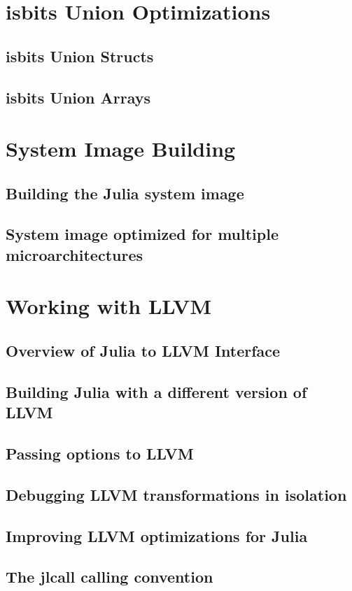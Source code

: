     \section{isbits Union Optimizations}
    \subsection{isbits Union Structs}
    \subsection{isbits Union Arrays}
    \section{System Image Building}
    \subsection{Building the Julia system image}
    \subsection{System image optimized for multiple microarchitectures}
    \section{Working with LLVM}
    \subsection{Overview of Julia to LLVM Interface}
    \subsection{Building Julia with a different version of LLVM}
    \subsection{Passing options to LLVM}
    \subsection{Debugging LLVM transformations in isolation}
    \subsection{Improving LLVM optimizations for Julia}
    \subsection{The jlcall calling convention}
